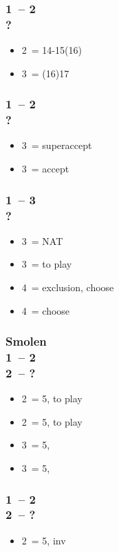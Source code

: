 \subsubsection*{1\ntx\ -- 2\spades \\ ?}
\begin{itemize}
    \item 2\nt\ = 14-15(16)
    \item 3\clubs\ = (16)17
\end{itemize}

\subsubsection*{1\ntx\ -- 2\ntx \\ ?}
\begin{itemize}
    \item 3\clubs\ = superaccept
    \item 3\diams\ = accept
\end{itemize}

\subsubsection*{1\ntx\ -- 3\hearts \\ ?}
\begin{itemize}
    \item 3\spades\ = NAT
    \item 3\nt\ = to play
    \item 4\hearts\ = exclusion, choose \minor
    \item 4\nt\ = choose \minor
\end{itemize}

\subsubsection*{Smolen \\
                1\ntx\ -- 2\clubs \\
                2\diams\ -- ?}
\begin{itemize}
    \item 2\hearts\ = 5\spades, to play
    \item 2\spades\ = 5\hearts, to play
    \item 3\hearts\ = 5\hearts, \gf
    \item 3\spades\ = 5\spades, \gf
\end{itemize}

\subsubsection*{1\ntx\ -- 2\diams \\
                2\hearts\ -- ?}
\begin{itemize}
    \item 2\spades\ = 5\spades, inv
\end{itemize}

